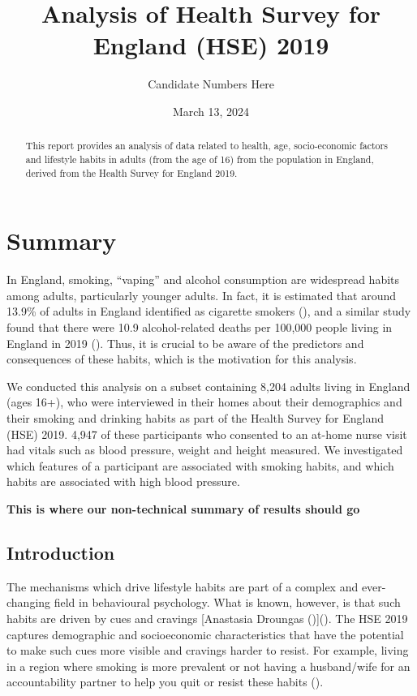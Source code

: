\documentclass[
  11pt,
  twocolumn]{article}
\title{Analysis of Health Survey for England (HSE) 2019}
\author{Candidate Numbers Here}
\date{March 13, 2024}
\begin{document}
\maketitle
\begin{abstract}
This report provides an analysis of data related to health, age,
socio-economic factors and lifestyle habits in adults (from the age of
16) from the population in England, derived from the Health Survey for
England 2019.
\end{abstract}


\clearpage

\section{Summary}\label{summary}

In England, smoking, ``vaping'' and alcohol consumption are widespread
habits among adults, particularly younger adults. In fact, it is
estimated that around 13.9\% of adults in England identified as
cigarette smokers (), and a similar study
found that there were 10.9 alcohol-related deaths per 100,000 people
living in England in 2019 (). Thus, it is
crucial to be aware of the predictors and consequences of these habits,
which is the motivation for this analysis.

We conducted this analysis on a subset containing 8,204 adults living in
England (ages 16+), who were interviewed in their homes about their
demographics and their smoking and drinking habits as part of the Health
Survey for England (HSE) 2019. 4,947 of these participants who consented
to an at-home nurse visit had vitals such as blood pressure, weight and
height measured. We investigated which features of a participant are
associated with smoking habits, and which habits are associated with
high blood pressure.

\textbf{This is where our non-technical summary of results should go}

\subsection{Introduction}\label{introduction}

The mechanisms which drive lifestyle habits are part of a complex and
ever-changing field in behavioural psychology. What is known, however,
is that such habits are driven by cues and cravings {[}Anastasia
Droungas
(){]}(). The HSE 2019 captures demographic and socioeconomic
characteristics that have the potential to make such cues more visible
and cravings harder to resist. For example, living in a region where
smoking is more prevalent or not having a husband/wife for an
accountability partner to help you quit or resist these habits
().
\end{document}
